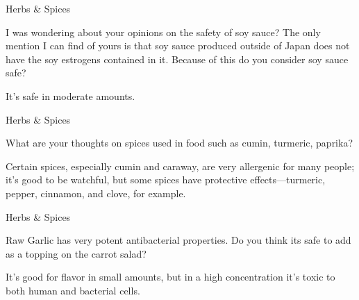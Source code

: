 \documentclass[11pt,oneside,openany,extrafontsizes]{memoir}
\begin{document}
\begin{qaexchange}{Herbs \& Spices}

    \begin{question}
        I was wondering about your opinions on the safety of soy sauce? The only mention I can find of yours is that soy sauce produced outside of Japan does not have the soy estrogens contained in it. Because of this do you consider soy sauce safe?
    \end{question}

    \begin{answer}
       It's safe in moderate amounts. 
    \end{answer}
\end{qaexchange}

\begin{qaexchange}{Herbs \& Spices}

    \begin{question}
         What are your thoughts on spices used in food such as cumin, turmeric, paprika?
    \end{question}

    \begin{answer}
       Certain spices, especially cumin and caraway, are very allergenic for many people; it's good to be watchful, but some spices have protective effects—turmeric, pepper, cinnamon, and clove, for example. 
    \end{answer}
\end{qaexchange}

\begin{qaexchange}{Herbs \& Spices}

    \begin{question}
         Raw Garlic has very potent antibacterial properties. Do you think its safe to add as a topping on the carrot salad? 
    \end{question}

    \begin{answer}
      It's good for flavor in small amounts, but in a high concentration it's toxic to both human and bacterial cells.
    \end{answer}
\end{qaexchange}
\end{document}
